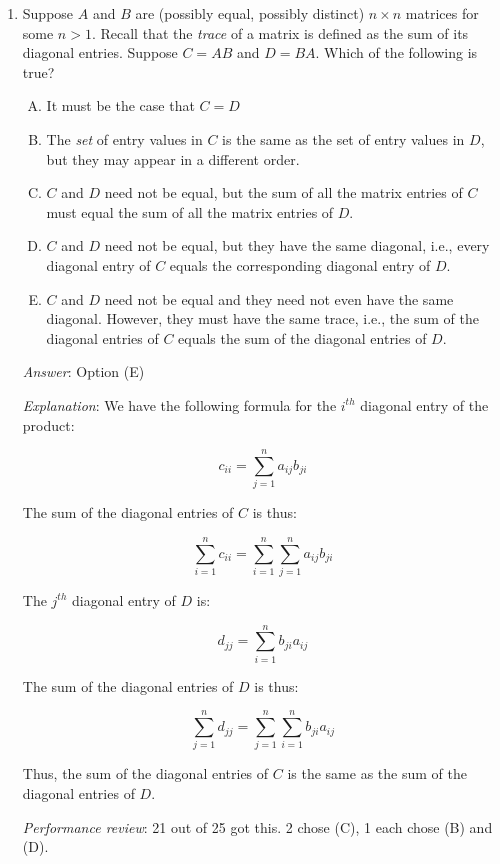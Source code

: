 \documentclass[10pt]{amsart}
\begin{document}
\begin{enumerate}

\item Suppose $A$ and $B$ are (possibly equal, possibly distinct) $n
  \times n$ matrices for some $n > 1$. Recall that the {\em trace} of
  a matrix is defined as the sum of its diagonal entries. Suppose $C =
  AB$ and $D = BA$. Which of the following is true?

  \begin{enumerate}[(A)]
  \item It must be the case that $C = D$
  \item The {\em set} of entry values in $C$ is the same as the set of
    entry values in $D$, but they may appear in a different order.
  \item $C$ and $D$ need not be equal, but the sum of all the matrix
    entries of $C$ must equal the sum of all the matrix entries of
    $D$.
  \item $C$ and $D$ need not be equal, but they have the same
    diagonal, i.e., every diagonal entry of $C$ equals the
    corresponding diagonal entry of $D$.
  \item $C$ and $D$ need not be equal and they need not even have the
    same diagonal. However, they must have the same trace, i.e., the
    sum of the diagonal entries of $C$ equals the sum of the diagonal
    entries of $D$.
  \end{enumerate}

  {\em Answer}: Option (E)

  {\em Explanation}: We have the following formula for the $i^{th}$ diagonal
  entry of the product:

  $$c_{ii} = \sum_{j=1}^n a_{ij}b_{ji}$$

  The sum of the diagonal entries of $C$ is thus:

  $$\sum_{i=1}^n c_{ii} = \sum_{i=1}^n \sum_{j=1}^n a_{ij}b_{ji}$$

  The $j^{th}$ diagonal entry of $D$ is:

  $$d_{jj} = \sum_{i=1}^n b_{ji}a_{ij}$$

  The sum of the diagonal entries of $D$ is thus:

  $$\sum_{j=1}^n d_{jj} = \sum_{j=1}^n \sum_{i=1}^n b_{ji}a_{ij}$$

  Thus, the sum of the diagonal entries of $C$ is the same as the sum
  of the diagonal entries of $D$.

  {\em Performance review}: 21 out of 25 got this. 2 chose (C), 1 each
  chose (B) and (D).


\end{enumerate}
\end{document}

